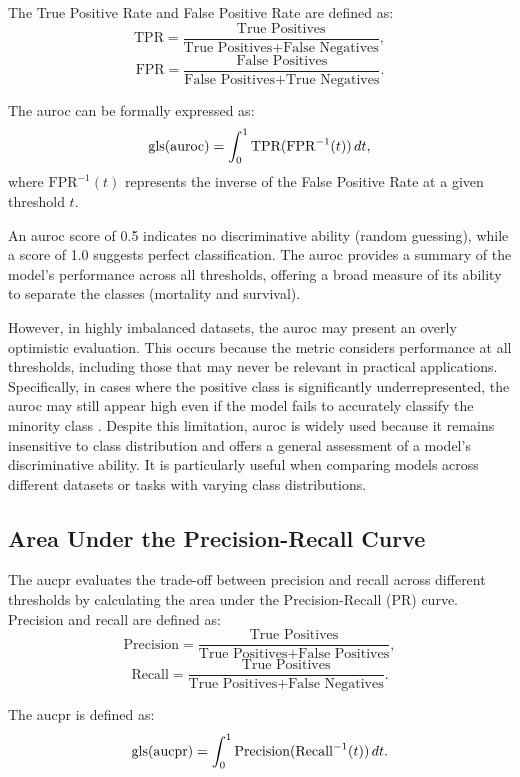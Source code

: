 The True Positive Rate and False Positive Rate are defined as:
\[
    \text{TPR} = \frac{\text{True Positives}}{\text{True Positives} + \text{False Negatives}},
\]
\[
    \text{FPR} = \frac{\text{False Positives}}{\text{False Positives} + \text{True Negatives}}.
\]

The \gls{auroc} can be formally expressed as:
\[
    \text{gls(auroc)} = \int_{0}^{1} \text{TPR}(\text{FPR}^{-1}(t)) \, dt,
\]
where \(\text{FPR}^{-1}(t)\) represents the inverse of the False Positive Rate at a given threshold \(t\).

An \gls{auroc} score of 0.5 indicates no discriminative ability (random guessing), while a score of 1.0 suggests perfect classification. The \gls{auroc} provides a summary of the model's performance across all thresholds, offering a broad measure of its ability to separate the classes (mortality and survival).

However, in highly imbalanced datasets, the \gls{auroc} may present an overly optimistic evaluation. This occurs because the metric considers performance at all thresholds, including those that may never be relevant in practical applications. Specifically, in cases where the positive class is significantly underrepresented, the \gls{auroc} may still appear high even if the model fails to accurately classify the minority class \cite{IntroductionROCAnalysis2006}. Despite this limitation, \gls{auroc} is widely used because it remains insensitive to class distribution and offers a general assessment of a model's discriminative ability. It is particularly useful when comparing models across different datasets or tasks with varying class distributions.

\subsection{Area Under the Precision-Recall Curve}
\label{sec:aucpr}

The \gls{aucpr} evaluates the trade-off between precision and recall across different thresholds by calculating the area under the Precision-Recall (PR) curve. Precision and recall are defined as:
\[
    \text{Precision} = \frac{\text{True Positives}}{\text{True Positives} + \text{False Positives}},
\]
\[
    \text{Recall} = \frac{\text{True Positives}}{\text{True Positives} + \text{False Negatives}}.
\]

The \gls{aucpr} is defined as:
\[
    \text{gls(aucpr)} = \int_{0}^{1} \text{Precision}(\text{Recall}^{-1}(t)) \, dt.
\]

